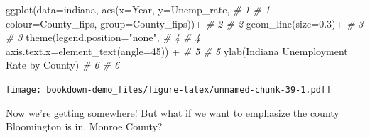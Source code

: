 \documentclass[
]{book}
\newenvironment{Shaded}{\begin{snugshade}}{\end{snugshade}}
\newcommand{\AttributeTok}[1]{\textcolor[rgb]{0.77,0.63,0.00}{#1}}
\newcommand{\CommentTok}[1]{\textcolor[rgb]{0.56,0.35,0.01}{\textit{#1}}}
\newcommand{\DecValTok}[1]{\textcolor[rgb]{0.00,0.00,0.81}{#1}}
\newcommand{\FloatTok}[1]{\textcolor[rgb]{0.00,0.00,0.81}{#1}}
\newcommand{\FunctionTok}[1]{\textcolor[rgb]{0.00,0.00,0.00}{#1}}
\newcommand{\NormalTok}[1]{#1}
\newcommand{\SpecialCharTok}[1]{\textcolor[rgb]{0.00,0.00,0.00}{#1}}
\newcommand{\StringTok}[1]{\textcolor[rgb]{0.31,0.60,0.02}{#1}}
\begin{document}
\begin{Shaded}
\begin{Highlighting}[]
\FunctionTok{ggplot}\NormalTok{(}\AttributeTok{data=}\NormalTok{indiana, }\FunctionTok{aes}\NormalTok{(}\AttributeTok{x=}\NormalTok{Year, }\AttributeTok{y=}\NormalTok{Unemp\_rate,   }\CommentTok{\# 1  \# 1}
    \AttributeTok{colour=}\NormalTok{County\_fips, }\AttributeTok{group=}\NormalTok{County\_fips))}\SpecialCharTok{+}     \CommentTok{\# 2  \# 2}
  \FunctionTok{geom\_line}\NormalTok{(}\AttributeTok{size=}\FloatTok{0.3}\NormalTok{)}\SpecialCharTok{+}                           \CommentTok{\# 3  \# 3}
  \FunctionTok{theme}\NormalTok{(}\AttributeTok{legend.position=}\StringTok{"none"}\NormalTok{,                  }\CommentTok{\# 4  \# 4}
    \AttributeTok{axis.text.x=}\FunctionTok{element\_text}\NormalTok{(}\AttributeTok{angle=}\DecValTok{45}\NormalTok{)) }\SpecialCharTok{+}        \CommentTok{\# 5  \# 5}
  \FunctionTok{ylab}\NormalTok{(}\StringTok{\textquotesingle{}Indiana Unemployment Rate by County\textquotesingle{}}\NormalTok{)    }\CommentTok{\# 6  \# 6}
\end{Highlighting}
\end{Shaded}

\texttt{[image: bookdown-demo\_files/figure-latex/unnamed-chunk-39-1.pdf]}

Now we're getting somewhere! But what if we want to emphasize the county Bloomington is in, Monroe County?
\end{document}
